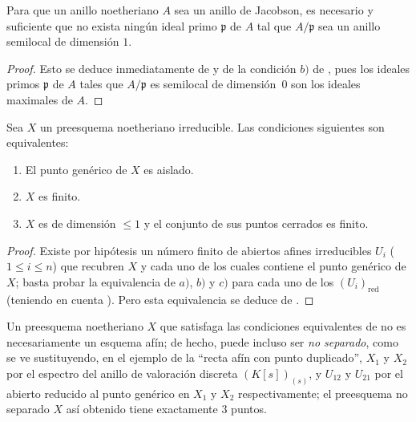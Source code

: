 \begin{corollary}[10.5.2]
\label{IV.10.5.2}
Para que un anillo noetheriano $A$ sea un anillo de Jacobson, es necesario y suficiente que no exista ningún ideal primo $\mathfrak{p}$ de $A$ tal que $A/\mathfrak{p}$ sea un anillo semilocal de dimensión $1$.
\end{corollary}

\begin{proof}
Esto se deduce inmediatamente de  y de la condición $b)$ de , pues los ideales primos $\mathfrak{p}$ de $A$ tales que $A/\mathfrak{p}$ es semilocal de dimensión~$0$ son los ideales maximales de $A$.
\end{proof}

\begin{corollary}[10.5.3]
\label{IV.10.5.3}
Sea $X$ un preesquema noetheriano irreducible.
Las condiciones siguientes son equivalentes:
\begin{enumerate}[label=\emph{\alph*)}]
  \item El punto genérico de $X$ es aislado.
  \item $X$ es finito.
  \item $X$ es de dimensión $\leq 1$ y el conjunto de sus puntos cerrados es finito.
\end{enumerate}
\end{corollary}

\begin{proof}
Existe por hipótesis un número finito de abiertos afines irreducibles $U_i$ ($1\leq i\leq n$) que recubren $X$ y cada uno de los cuales contiene el punto genérico de $X$; basta probar la equivalencia de $a)$, $b)$ y $c)$ para cada uno de los $(U_i)_{\mathrm{red}}$ (teniendo en cuenta ).
Pero esta equivalencia se deduce de .
\end{proof}

\begin{remark}[10.5.4]
\label{IV.10.5.4}
Un preesquema noetheriano $X$ que satisfaga las condiciones equivalentes de  no es necesariamente un esquema afín; de hecho, puede incluso ser \emph{no separado}, como se ve sustituyendo, en el ejemplo  de la ``recta afín con punto duplicado'', $X_1$ y $X_2$ por el espectro del anillo de valoración discreta $(K[s])_{(s)}$, y $U_{12}$ y $U_{21}$ por el abierto reducido al punto genérico en $X_1$ y $X_2$ respectivamente; el preesquema no separado $X$ así obtenido tiene exactamente $3$ puntos.
\end{remark}

